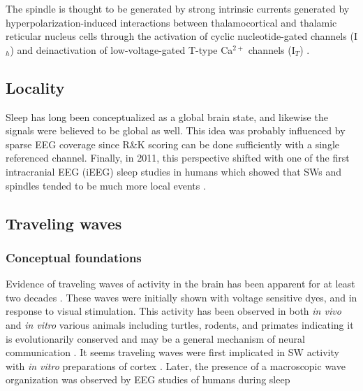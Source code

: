 The spindle is thought to be generated by strong intrinsic currents generated by hyperpolarization-induced interactions between thalamocortical and thalamic reticular nucleus cells through the activation of cyclic nucleotide-gated channels (I$_h$) and deinactivation of low-voltage-gated T-type Ca$^{2+}$ channels (I$_T$) \citep{Buzsaki2012, Crunelli2018, Mak-McCully2017}. %
\subsection*{Locality}
Sleep has long been conceptualized as a global brain state, and likewise the signals were believed to be global as well. This idea was probably influenced by sparse EEG coverage since R\&K scoring can be done sufficiently with a single referenced channel. Finally, in 2011, this perspective shifted with one of the first intracranial EEG (iEEG) sleep studies in humans which showed that SWs and spindles tended to be much more local events \citep{Nir2011}.

\subsection*{Traveling waves}
\subsubsection*{Conceptual foundations}
Evidence of traveling waves of activity in the brain has been apparent for at least two decades \citep{Grinvald1994, Prechtl1997, Muller2018}. These waves were initially shown with voltage sensitive dyes, and in response to visual stimulation. 
This activity has been observed in both \textit{in vivo} and \textit{in vitro} various animals including turtles, rodents, and primates indicating it is evolutionarily conserved and may be a general mechanism of neural communication \cite{Grinvald1994, Prechtl1997, Takahashi2011, Muller2014}.
It seems traveling waves were first implicated in SW activity with \textit{in vitro} preparations of cortex \citep{Sanchez-Vives2000}. Later, the presence of a macroscopic wave organization was observed by EEG studies of humans during sleep \citep{Massimini2004}

